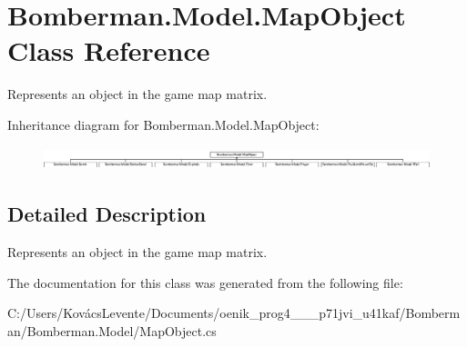 \hypertarget{class_bomberman_1_1_model_1_1_map_object}{}\section{Bomberman.\+Model.\+Map\+Object Class Reference}
\label{class_bomberman_1_1_model_1_1_map_object}


Represents an object in the game map matrix.  


Inheritance diagram for Bomberman.\+Model.\+Map\+Object\+:\begin{figure}[H]
\begin{center}
\leavevmode
\includegraphics[height=0.680851cm]{class_bomberman_1_1_model_1_1_map_object}
\end{center}
\end{figure}


\subsection{Detailed Description}
Represents an object in the game map matrix. 



The documentation for this class was generated from the following file\+:\begin{DoxyCompactItemize}
\item 
C\+:/\+Users/\+Kovács\+Levente/\+Documents/oenik\+\_\+prog4\+\_\+\_\+\_\+p71jvi\+\_\+u41kaf/\+Bomberman/\+Bomberman.\+Model/Map\+Object.\+cs\end{DoxyCompactItemize}
